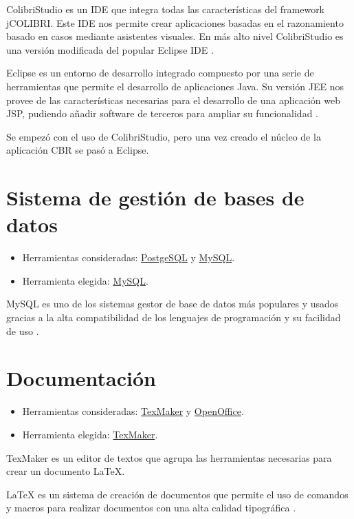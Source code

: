 ColibriStudio es un IDE que integra todas las características del framework jCOLIBRI. Este IDE nos permite crear aplicaciones basadas en el razonamiento basado en casos mediante asistentes visuales. En más alto nivel ColibriStudio es una versión modificada del popular Eclipse IDE \cite{colibri:studio}.

Eclipse es un entorno de desarrollo integrado compuesto por una serie de herramientas que permite el desarrollo de aplicaciones Java. Su versión JEE nos provee de las características necesarias para el desarrollo de una aplicación web JSP, pudiendo añadir software de terceros para ampliar su funcionalidad \cite{eclipse:info}.

Se empezó con el uso de ColibriStudio, pero una vez creado el núcleo de la aplicación CBR se pasó a Eclipse.

\section{Sistema de gestión de bases de datos}

\begin{itemize}
\tightlist
\item
  Herramientas consideradas: \href{http://www.postgresql.org.es/}{PostgeSQL} y \href{https://www.mysql.com/}{MySQL}.
\item
  Herramienta elegida: \href{https://www.mysql.com/}{MySQL}.
\end{itemize}

MySQL es uno de los sistemas gestor de base de datos más populares y usados gracias a la alta compatibilidad de los lenguajes de programación y su facilidad de uso \cite{mysql:wiki}.

\section{Documentación}

\begin{itemize}
\tightlist
\item
  Herramientas consideradas: \href{http://www.xm1math.net/texmaker/}{TexMaker} y \href{https://www.openoffice.org/es/}{OpenOffice}.
\item
  Herramienta elegida: \href{http://www.xm1math.net/texmaker/}{TexMaker}.
\end{itemize}

TexMaker es un editor de textos que agrupa las herramientas necesarias para crear un documento LaTeX.

LaTeX es un sistema de creación de documentos que permite el uso de comandos y macros para realizar documentos con una alta calidad tipográfica \cite{latex:wiki}.

